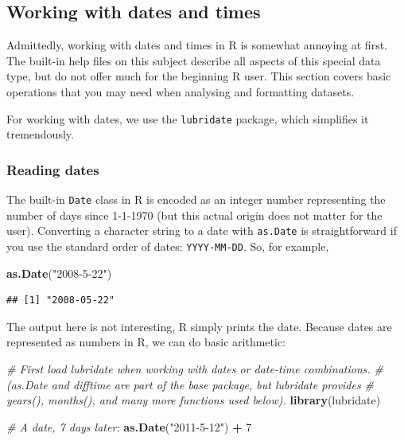 \documentclass[]{book}
\newenvironment{Shaded}{\begin{snugshade}}{\end{snugshade}}
\newcommand{\CommentTok}[1]{\textcolor[rgb]{0.56,0.35,0.01}{\textit{#1}}}
\newcommand{\DecValTok}[1]{\textcolor[rgb]{0.00,0.00,0.81}{#1}}
\newcommand{\KeywordTok}[1]{\textcolor[rgb]{0.13,0.29,0.53}{\textbf{#1}}}
\newcommand{\NormalTok}[1]{#1}
\newcommand{\OperatorTok}[1]{\textcolor[rgb]{0.81,0.36,0.00}{\textbf{#1}}}
\newcommand{\StringTok}[1]{\textcolor[rgb]{0.31,0.60,0.02}{#1}}
\begin{document}
\hypertarget{workingwithdates}{%
\subsection{Working with dates and times}\label{workingwithdates}}

Admittedly, working with dates and times in R is somewhat annoying at first. The built-in help files on this subject describe all aspects of this special data type, but do not offer much for the beginning R user. This section covers basic operations that you may need when analysing and formatting datasets.

For working with dates, we use the \texttt{lubridate} package, which simplifies it tremendously.

\hypertarget{readingdates}{%
\subsubsection{Reading dates}\label{readingdates}}

The built-in \texttt{Date} class in R is encoded as an integer number representing the number of days since 1-1-1970 (but this actual origin does not matter for the user). Converting a character string to a date with \texttt{as.Date} is straightforward if you use the standard order of dates: \texttt{YYYY-MM-DD}. So, for example,

\begin{Shaded}
\begin{Highlighting}[]
\KeywordTok{as.Date}\NormalTok{(}\StringTok{"2008-5-22"}\NormalTok{)}
\end{Highlighting}
\end{Shaded}

\begin{verbatim}
## [1] "2008-05-22"
\end{verbatim}

The output here is not interesting, R simply prints the date. Because dates are represented as numbers in R, we can do basic arithmetic:

\begin{Shaded}
\begin{Highlighting}[]
\CommentTok{# First load lubridate when working with dates or date-time combinations.}
\CommentTok{# (as.Date and difftime are part of the base package, but lubridate provides}
\CommentTok{# years(), months(), and many more functions used below).}
\KeywordTok{library}\NormalTok{(lubridate)}

\CommentTok{# A date, 7 days later:}
\KeywordTok{as.Date}\NormalTok{(}\StringTok{"2011-5-12"}\NormalTok{) }\OperatorTok{+}\StringTok{ }\DecValTok{7}
\end{Highlighting}
\end{Shaded}
\end{document}
